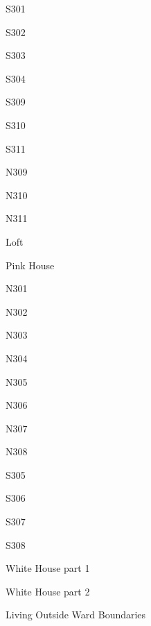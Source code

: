 {{S301}}

\pagebreak

{{S302}}

\pagebreak

{{S303}}

\pagebreak

{{S304}}

\pagebreak

{{S309}}

\pagebreak

{{S310}}

\pagebreak

{{S311}}

\pagebreak

{{N309}}

\pagebreak

{{N310}}

\pagebreak

{{N311}}

\pagebreak

{{Loft}}

\pagebreak

{{Pink House}}

\pagebreak

{{N301}}

\pagebreak

{{N302}}

\pagebreak

{{N303}}

\pagebreak

{{N304}}

\pagebreak

{{N305}}

\pagebreak

{{N306}}

\pagebreak

{{N307}}

\pagebreak

{{N308}}

\pagebreak

{{S305}}

\pagebreak

{{S306}}

\pagebreak

{{S307}}

\pagebreak

{{S308}}

\pagebreak

{{White House part 1}}

\pagebreak

{{White House part 2}}

\pagebreak

{{Living Outside Ward Boundaries}}

\pagebreak